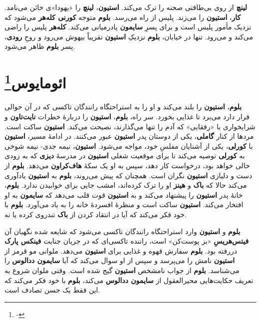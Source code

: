 \documentclass[12pt]{book}
\newcommand{\noun}[1]{{\textbf{#1}}}
\begin{document}
    \noun{لینچ} از روی بی‌طاقتی صحنه را ترک می‌کند. \noun{استیون}، \noun{لینچ} را «یهودا»ی خائن می‌نامد. \noun{کار}، \noun{استیون} را می‌زند. پلیس از راه می‌رسد. \noun{بلوم} متوجه \noun{کورنی کله‌هر} می‌شود که نزدیک مأمور پلیس است و برای پسرِ \noun{سایمون}  پادرمیانی می‌کند. \noun{کله‌هر} پلیس را راضی می‌کند و می‌رود. تنها در خیابان، \noun{بلوم} نزدیکِ \noun{استیون} تقریباً بیهوش می‌رود و روحِ \noun{رودی}، پسر \noun{بلوم} ظاهر می‌شود.

    \chapter[ائومایوس]{ائومایوس\protect\footnote{-}}\label{ep:16}
    \noun{بلوم}، \noun{استیون} را بلند می‌کند و او را به استراحتگاه رانندگان تاکسی که در آن حوالی قرار دارد می‌برد تا غذایی بخورد. سر راه، \noun{بلوم}، \noun{استیون} را دربارهٔ خطرات \noun{نایت‌تاون} و شرابخواری با «رفقایی» که آدم را تنها می‌گذارند، نصیحت می‌کند. \noun{استیون} ساکت است. مردها از کنار \noun{گاملی}، یکی از دوستان پدر \noun{استیون} عبور می‌کنند. در ادامهٔ مسیر، \noun{استیون} با \noun{کورلی}، یکی از آشنایان مفلسِ خود، مواجه می‌شود. \noun{استیون}، نیمه جدی- نیمه شوخی به \noun{کورلی} توصیه می‌کند تا برای موقعیت شغلی \noun{استیون} در مدرسهٔ \noun{دیزی} که به زودی خالی خواهد بود، درخواست کار دهد، سپس به او یک سکهٔ \noun{هاف‌کراون} می‌دهد. \noun{بلوم} از دست و دلبازی \noun{استیون} نگران است. همچنان که پیش می‌روند، \noun{بلوم} به \noun{استیون} یادآوری می‌کند حالا که \noun{باک}  و \noun{هینز}  او را ترک کرده‌اند، امشب جایی برای خوابیدن ندارد. \noun{بلوم}، خانهٔ پدر \noun{استیون} را پیشنهاد می‌کند و به \noun{استیون} قوت قلب می‌دهد که \noun{سایمون}  به او افتخار می‌کند. \noun{استیون} ساکت است و منظرهٔ افسردهٔ خانه را به یاد می‌آورد. \noun{بلوم} با خود فکر می‌کند که آیا در انتقاد کردن از \noun{باک}  تندروی کرده یا نه.

    \noun{بلوم} و \noun{استیون} وارد استراحتگاه رانندگان تاکسی می‌شود که شایعه شده نگهبان آن \noun{فیتس‌هریسِ} «بز پوست‌کن» است، راننده تاکسی‌ای که در جریان جنایت \noun{فینکس پارک} دررفته بود. \noun{بلوم} سفارش قهوه و غذایی برای \noun{استیون} می‌دهد. ملوانی مو قرمز از \noun{استیون} نامش را می‌پرسد و سپس از او سوال می‌کند که آیا \noun{سایمون ددالوس‬} را می‌شناسد. \noun{بلوم} از جواب نامشخص \noun{استیون} گیج شده است. وقتی ملوان شروع به تعریف حکایت‌هایی محیرالعقول از \noun{سایمون ددالوس‬} می‌کند، \noun{بلوم} با خود فکر می‌کند که این فقط یک حسن تصادف است.
\end{document}
